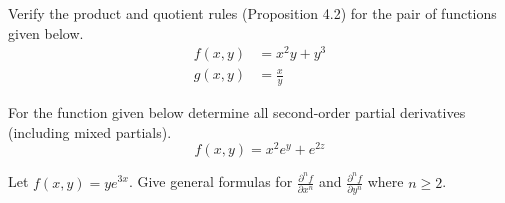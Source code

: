 \documentclass[oneperpage]{gsypset}
\begin{document}
	\begin{problem}[2.4.5]
		Verify the product and quotient rules (Proposition 4.2) for the pair of functions given below.
		\begin{align*}
			f(x,y) &= x^2y + y^3 \\
			g(x,y) &= \frac{x}{y}
		\end{align*}
	\end{problem}
	\begin{solution}
		
	\end{solution}
	
	\begin{problem}[2.4.17]
		For the function given below determine all second-order partial derivatives
		(including mixed partials).
		\[
			f(x,y) = x^2e^y + e^{2z}
		\]
	\end{problem}
	\begin{solution}
		
	\end{solution}
	
	\begin{problem}[2.4.23]
		Let $f(x,y) = ye^{3x}$.
		Give general formulas for 
		$\frac{\partial^n f}{\partial x^n}$ and $\frac{\partial^n f}{\partial y^n}$
		where $n \geq 2$.
	\end{problem}
	\begin{solution}
		
	\end{solution}
	
\end{document}

